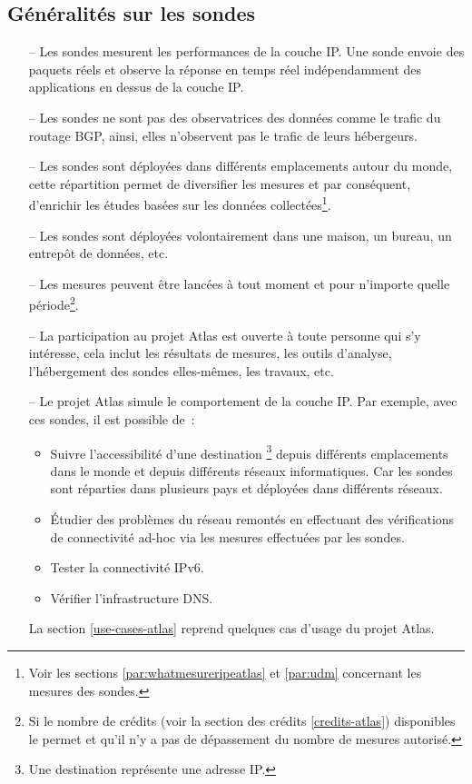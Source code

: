\subsection{Généralités sur les sondes}
\begin{itemize}
	\item[--] Les sondes   mesurent les performances de la couche IP. Une sonde  envoie des paquets réels et observe la réponse en temps réel indépendamment des applications en dessus de la couche IP.
	
	\item[--] Les sondes  ne sont pas des observatrices des données comme le trafic du routage BGP, ainsi, elles n'observent pas  le trafic de leurs hébergeurs.
	
	\item[--] Les sondes   sont déployées dans différents emplacements autour du monde, cette répartition permet de diversifier les mesures et par conséquent, d'enrichir les études basées sur les données collectées\footnote{Voir les sections \ref{par:whatmesureripeatlas} et \ref{par:udm} concernant les mesures des sondes.}. 
	
	\item[--] Les sondes  sont déployées volontairement dans une maison, un bureau,  un entrepôt de données, etc.
	
	\item[--] Les mesures peuvent être lancées à tout moment et pour n'importe quelle période\footnote{Si le nombre de crédits (voir la section des crédits \ref{credits-atlas}) disponibles le permet et qu'il n'y a pas de dépassement du nombre de mesures autorisé.}.
	
	\item[--] La participation au projet  Atlas est ouverte à toute personne qui s'y intéresse, cela inclut  les résultats de mesures, les outils d'analyse, l'hébergement des sondes elles-mêmes, les travaux, etc.
	
	\item[--] Le projet Atlas simule le comportement de la couche IP. Par exemple, avec ces sondes, il est possible  de~:
	\begin{itemize}[label=\textbullet]
		\item Suivre l'accessibilité d'une destination \footnote{Une destination représente une adresse IP.} depuis différents emplacements dans le monde et  depuis différents réseaux informatiques. Car les sondes  sont réparties dans plusieurs pays et déployées dans différents réseaux.
		
		\item Étudier des problèmes du réseau remontés en effectuant des vérifications de connectivité ad-hoc via les mesures effectuées par les sondes.
		
		\item Tester la connectivité IPv6.
		
		\item Vérifier l'infrastructure DNS.
	\end{itemize}
	
	La section  \ref{use-cases-atlas} reprend quelques cas d'usage du projet Atlas.  
\end{itemize}

